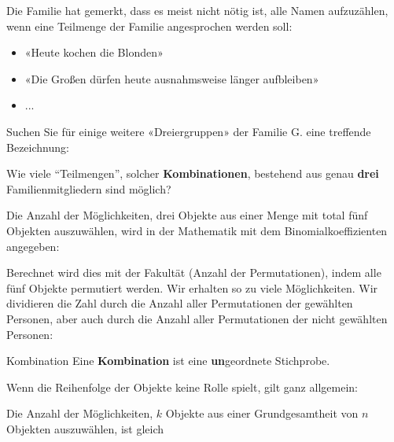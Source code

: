 Die Familie hat gemerkt, dass es meist nicht nötig ist, alle Namen
aufzuzählen, wenn eine Teilmenge der Familie angesprochen werden soll:

\begin{itemize}
\item «Heute kochen die Blonden»
\item «Die Großen dürfen heute ausnahmsweise länger aufbleiben»
\item ...
\end{itemize}


Suchen Sie für einige weitere «Dreiergruppen» der Familie G. eine treffende Bezeichnung:

\newpage



Wie viele ``Teilmengen'', solcher \textbf{Kombinationen}, bestehend aus genau \textbf{drei} Familienmitgliedern sind möglich?



Die Anzahl der Möglichkeiten, drei Objekte aus einer Menge mit total
fünf Objekten auszuwählen, wird in der Mathematik mit dem
Binomialkoeffizienten angegeben:


Berechnet wird dies mit der Fakultät (Anzahl der Permutationen), indem
alle fünf Objekte permutiert werden. Wir erhalten so zu viele
Möglichkeiten. Wir dividieren die Zahl durch die Anzahl aller Permutationen der
gewählten Personen, aber auch durch die Anzahl aller Permutationen der
nicht gewählten Personen:

\newpage

\begin{definition}{Kombination}{}
Eine \textbf{Kombination} ist eine \textbf{un}geordnete Stichprobe.
\end{definition}

Wenn die Reihenfolge der Objekte keine Rolle spielt, gilt ganz
allgemein:

Die Anzahl der Möglichkeiten, $k$ Objekte aus einer Grundgesamtheit
von $n$ Objekten auszuwählen, ist gleich

